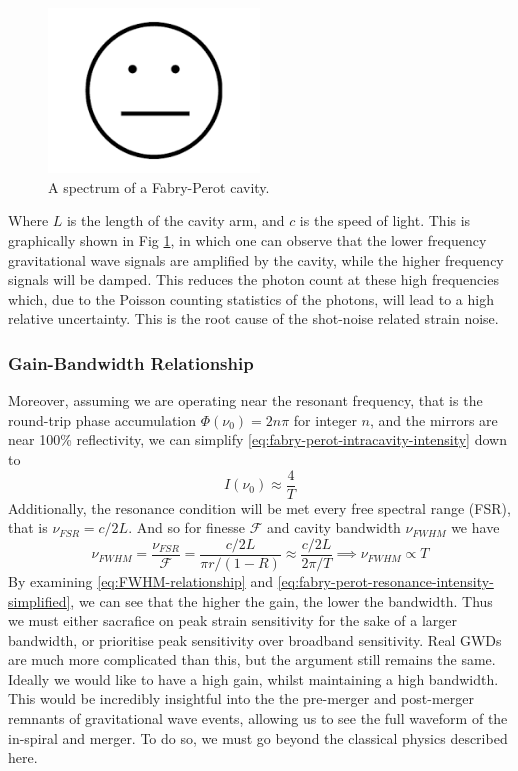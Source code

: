 \documentclass[aps,  
                a4paper, 
                amsmath, 
                amssymb, 
                preprint,
                tightenlines,  
                amsfonts,
                nofootinbib,
                onecolumn,
                titlepage,
                10pt
            ]{revtex4-2}
\begin{document}
    \begin{figure}
        \centering
        \includegraphics[width=0.5\textwidth]{img/blank.png}
        \caption{A spectrum of a Fabry-Perot cavity.}
        \label{fig:fabry-perot-spectrum}
    \end{figure}    
    Where $L$ is the length of the cavity arm, and $c$ is the speed of light. This is graphically shown in Fig \ref{fig:fabry-perot-spectrum}, in which one can observe that the lower frequency gravitational wave signals are amplified by the cavity, while the higher frequency signals will be damped. This reduces the photon count at these high frequencies which, due to the Poisson counting statistics of the photons, will lead to a high relative uncertainty. This is the root cause of the shot-noise related strain noise.
    \subsubsection*{Gain-Bandwidth Relationship}
    Moreover, assuming we are operating near the resonant frequency, that is the round-trip phase accumulation $\Phi(\nu_0)= 2n\pi$ for integer $n$, and the mirrors are near 100\% reflectivity, we can simplify \eqref{eq:fabry-perot-intracavity-intensity} down to
    \begin{equation}
        \label{eq:fabry-perot-resonance-intensity-simplified}
        I(\nu_0)\approx\frac{4}{T}
    \end{equation}
    Additionally, the resonance condition will be met every free spectral range (FSR), that is $\nu_{FSR}=c/2L$. And so for finesse $\mathcal{F}$ and cavity bandwidth $\nu_{FWHM}$ we have
    \begin{equation}
        \label{eq:FWHM-relationship}
        \nu_{FWHM}=\frac{\nu_{FSR}}{\mathcal{F}}=\frac{c/2L}{\pi r/(1-R)}\approx\frac{c/2L}{2\pi/T}\implies\nu_{FWHM}\propto T
    \end{equation}
    By examining \eqref{eq:FWHM-relationship} and \eqref{eq:fabry-perot-resonance-intensity-simplified}, we can see that the higher the gain, the lower the bandwidth. Thus we must either sacrafice on peak strain sensitivity for the sake of a larger bandwidth, or prioritise peak sensitivity over broadband sensitivity. Real GWDs are much more complicated than this, but the argument still remains the same. Ideally we would like to have a high gain, whilst maintaining a high bandwidth. This would be incredibly insightful into the the pre-merger and post-merger remnants of gravitational wave events, allowing us to see the full waveform of the in-spiral and merger. To do so, we must go beyond the classical physics described here.
\end{document}
